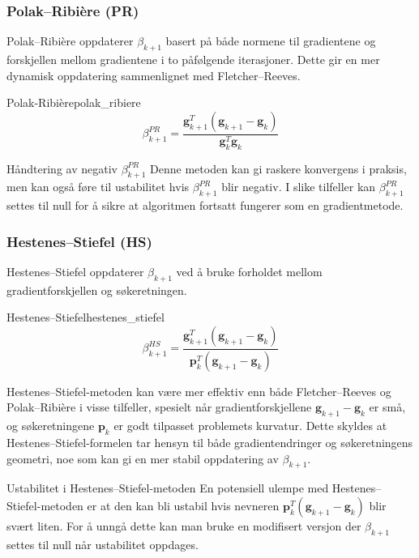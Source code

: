 \subsubsection{Polak--Ribière (PR)}
Polak--Ribière oppdaterer \(\beta_{k+1}\) basert på både normene til gradientene og forskjellen mellom gradientene i to påfølgende iterasjoner. Dette gir en mer dynamisk oppdatering sammenlignet med Fletcher--Reeves.
\begin{definition}{Polak-Ribière}{polak_ribiere}
	\[
		\beta_{k+1}^{PR} = \frac{\symbf{g}_{k+1}^T(\symbf{g}_{k+1}-\symbf{g}_k)}{\symbf{g}_k^T\symbf{g}_k} \tag{PR}
	\]
\end{definition}


\begin{remark}{Håndtering av negativ \(\beta_{k+1}^{PR}\)}{}
	Denne metoden kan gi raskere konvergens i praksis, men kan også føre til ustabilitet hvis \(\beta_{k+1}^{PR}\) blir negativ.
	I slike tilfeller kan \(\beta_{k+1}^{PR}\) settes til null for å sikre at algoritmen fortsatt fungerer som en gradientmetode.
\end{remark}

\subsubsection{Hestenes--Stiefel (HS)}
Hestenes--Stiefel oppdaterer \(\beta_{k+1}\) ved å bruke forholdet mellom gradientforskjellen og søkeretningen.
\begin{definition}{Hestenes--Stiefel}{hestenes_stiefel}
	\[
		\beta_{k+1}^{HS} = \frac{\symbf{g}_{k+1}^T(\symbf{g}_{k+1} - \symbf{g}_k)}{\symbf{p}_k^T(\symbf{g}_{k+1} - \symbf{g}_k)} \tag{HS}
	\]
\end{definition}
Hestenes--Stiefel-metoden kan være mer effektiv enn både Fletcher--Reeves og Polak--Ribière i visse tilfeller, spesielt når gradientforskjellene \(\symbf{g}_{k+1} - \symbf{g}_k\) er små, og søkeretningene \(\symbf{p}_k\) er godt tilpasset problemets kurvatur.
Dette skyldes at Hestenes--Stiefel-formelen tar hensyn til både gradientendringer og søkeretningens geometri, noe som kan gi en mer stabil oppdatering av \(\beta_{k+1}\).

\begin{remark}{Ustabilitet i Hestenes--Stiefel-metoden}{}
	En potensiell ulempe med Hestenes--Stiefel-metoden er at den kan bli ustabil hvis nevneren \(\symbf{p}_k^T(\symbf{g}_{k+1} - \symbf{g}_k)\) blir svært liten. For å unngå dette kan man bruke en modifisert versjon der \(\beta_{k+1}\) settes til null når ustabilitet oppdages.
\end{remark}

